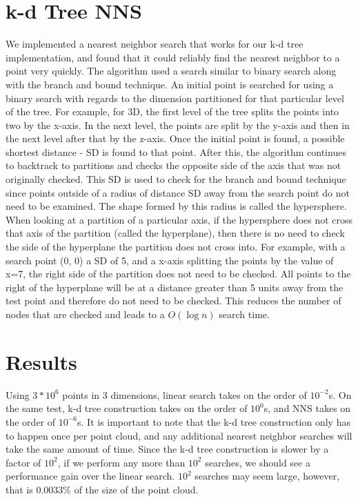 \documentclass[a4paper,12pt]{article}
\begin{document}
\section{k-d Tree NNS}
We implemented a nearest neighbor search that works for our k-d tree implementation,
and found that it could reliably find the nearest neighbor to a point very quickly.
The algorithm used a search similar to binary search along with the branch and bound
technique. An initial point is searched for using a binary search with regards to the
dimension partitioned for that particular level of the tree. For example, for 3D,
the first level of the tree splits the points into two by the x-axis. In the next level,
the points are split by the y-axis and then in the next level after that by the z-axis.
Once the initial point is found, a possible shortest distance - SD is found to that point.
After this, the algorithm continues to backtrack to partitions and checks the opposite
side of the axis that was not originally checked. This SD is used to check for the branch
and bound technique since points outside of a radius of distance SD away from the search
point do not need to be examined. The shape formed by this radius is called the hypersphere.
When looking at a partition of a particular axis, if the hypersphere does not cross that
axis of the partition (called the hyperplane), then there is no need to check the side of
the hyperplane the partition does not cross into. For example, with a search point (0, 0) a
SD of 5, and a x-axis splitting the points by the value of x=7, the right side of the partition
does not need to be checked. All points to the right of the hyperplane will be at a distance
greater than 5 units away from the test point and therefore do not need to be checked.
This reduces the number of nodes that are checked and leads to a $O(\log n)$ search time.

\section{Results}
Using $3*10^6$ points in 3 dimensions, linear search takes on the order of $10^{-2}$s.
On the same test, k-d tree construction takes on the order of $10^0$s, and NNS takes
on the order of $10^{-6}$s.
It is important to note that the k-d tree construction only has to happen once per point
cloud, and any additional nearest neighbor searches will take the same amount of time.
Since the k-d tree construction is slower by a factor of $10^2$, if we perform any more
than $10^2$ searches, we should see a performance gain over the linear search.
$10^2$ searches may seem large, however, that is $0.0033\%$ of the size of the point cloud.
\end{document}
